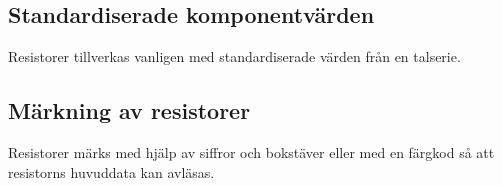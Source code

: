 \subsection{Standardiserade komponentvärden}

Resistorer tillverkas vanligen med standardiserade värden från en talserie.

\subsection{Märkning av resistorer}

Resistorer märks med hjälp av siffror och bokstäver eller med en färgkod så att
resistorns huvuddata kan avläsas.
